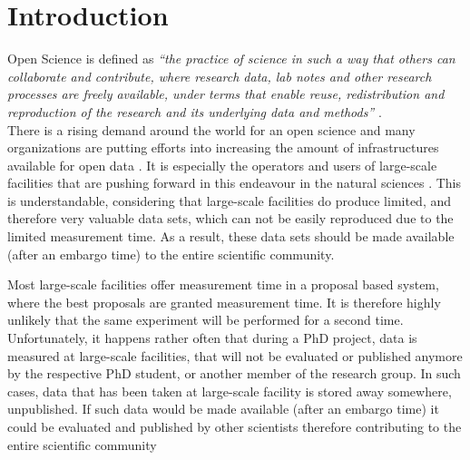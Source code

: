 \documentclass[aps,prx,reprint,amsmath,amssymb,superscriptaddress,showpacs]{revtex4-1}
\begin{document}
\maketitle



\section{Introduction}

Open Science is defined as \emph{``the practice of science in such a way that others can collaborate and contribute, where research data, lab notes and other research processes are freely available, under terms that enable reuse, redistribution and reproduction of the research and its underlying data and methods''} \cite{foster}.\\

There is a rising demand around the world for an open science and many organizations are putting efforts into increasing the amount of infrastructures available for open data \cite{plos, sharing, panosc, nfdi, expands}. 
It is especially the operators and users of large-scale facilities that are pushing forward in this endeavour in the natural sciences \cite{panosc, nfdi, expands}.
This is understandable, considering that large-scale facilities do produce limited, and therefore very valuable data sets, which can not be easily reproduced due to the limited measurement time. As a result, these data sets should be made available (after an embargo time) to the entire scientific community. 

Most large-scale facilities offer measurement time in a proposal based system, where the best proposals are granted measurement time.
It is therefore highly unlikely that the same experiment will be performed for a second time. 
Unfortunately, it happens rather often that during a PhD project, data is measured at large-scale facilities, that will not be evaluated or published anymore by the respective PhD student, or another member of the research group.
In such cases, data that has been taken at large-scale facility is stored away somewhere, unpublished.
If such data would be made available (after an embargo time) it could be evaluated and published by other scientists therefore contributing to the entire scientific community
\end{document}
